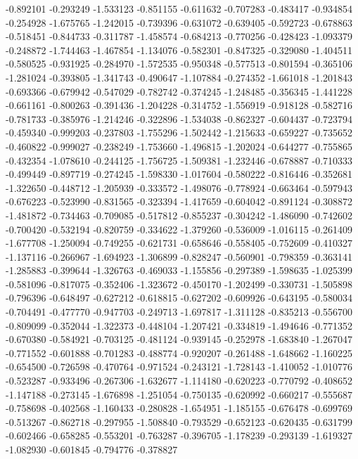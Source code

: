 -0.892101
-0.293249
-1.533123
-0.851155
-0.611632
-0.707283
-0.483417
-0.934854
-0.254928
-1.675765
-1.242015
-0.739396
-0.631072
-0.639405
-0.592723
-0.678863
-0.518451
-0.844733
-0.311787
-1.458574
-0.684213
-0.770256
-0.428423
-1.093379
-0.248872
-1.744463
-1.467854
-1.134076
-0.582301
-0.847325
-0.329080
-1.404511
-0.580525
-0.931925
-0.284970
-1.572535
-0.950348
-0.577513
-0.801594
-0.365106
-1.281024
-0.393805
-1.341743
-0.490647
-1.107884
-0.274352
-1.661018
-1.201843
-0.693366
-0.679942
-0.547029
-0.782742
-0.374245
-1.248485
-0.356345
-1.441228
-0.661161
-0.800263
-0.391436
-1.204228
-0.314752
-1.556919
-0.918128
-0.582716
-0.781733
-0.385976
-1.214246
-0.322896
-1.534038
-0.862327
-0.604437
-0.723794
-0.459340
-0.999203
-0.237803
-1.755296
-1.502442
-1.215633
-0.659227
-0.735652
-0.460822
-0.999027
-0.238249
-1.753660
-1.496815
-1.202024
-0.644277
-0.755865
-0.432354
-1.078610
-0.244125
-1.756725
-1.509381
-1.232446
-0.678887
-0.710333
-0.499449
-0.897719
-0.274245
-1.598330
-1.017604
-0.580222
-0.816446
-0.352681
-1.322650
-0.448712
-1.205939
-0.333572
-1.498076
-0.778924
-0.663464
-0.597943
-0.676223
-0.523990
-0.831565
-0.323394
-1.417659
-0.604042
-0.891124
-0.308872
-1.481872
-0.734463
-0.709085
-0.517812
-0.855237
-0.304242
-1.486090
-0.742602
-0.700420
-0.532194
-0.820759
-0.334622
-1.379260
-0.536009
-1.016115
-0.261409
-1.677708
-1.250094
-0.749255
-0.621731
-0.658646
-0.558405
-0.752609
-0.410327
-1.137116
-0.266967
-1.694923
-1.306899
-0.828247
-0.560901
-0.798359
-0.363141
-1.285883
-0.399644
-1.326763
-0.469033
-1.155856
-0.297389
-1.598635
-1.025399
-0.581096
-0.817075
-0.352406
-1.323672
-0.450170
-1.202499
-0.330731
-1.505898
-0.796396
-0.648497
-0.627212
-0.618815
-0.627202
-0.609926
-0.643195
-0.580034
-0.704491
-0.477770
-0.947703
-0.249713
-1.697817
-1.311128
-0.835213
-0.556700
-0.809099
-0.352044
-1.322373
-0.448104
-1.207421
-0.334819
-1.494646
-0.771352
-0.670380
-0.584921
-0.703125
-0.481124
-0.939145
-0.252978
-1.683840
-1.267047
-0.771552
-0.601888
-0.701283
-0.488774
-0.920207
-0.261488
-1.648662
-1.160225
-0.654500
-0.726598
-0.470764
-0.971524
-0.243121
-1.728143
-1.410052
-1.010776
-0.523287
-0.933496
-0.267306
-1.632677
-1.114180
-0.620223
-0.770792
-0.408652
-1.147188
-0.273145
-1.676898
-1.251054
-0.750135
-0.620992
-0.660217
-0.555687
-0.758698
-0.402568
-1.160433
-0.280828
-1.654951
-1.185155
-0.676478
-0.699769
-0.513267
-0.862718
-0.297955
-1.508840
-0.793529
-0.652123
-0.620435
-0.631799
-0.602466
-0.658285
-0.553201
-0.763287
-0.396705
-1.178239
-0.293139
-1.619327
-1.082930
-0.601845
-0.794776
-0.378827
